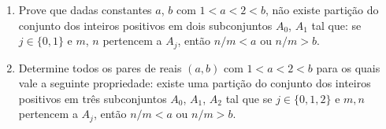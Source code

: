 \begin{enumerate}[label = (\alph*)]
	\item Prove que dadas constantes $a$, $b$ com $1 < a < 2 < b$, não existe partição do conjunto dos inteiros positivos em dois subconjuntos $A_0$, $A_1$ tal que: se $j \in \{0, 1\}$ e $m$, $n$ pertencem a $A_j$, então $n/m < a$ ou $n/m > b$.
	\item Determine todos os pares de reais $(a, b)$ com $1 < a < 2 < b$ para os quais vale a seguinte propriedade: existe uma partição do conjunto dos inteiros positivos em três subconjuntos $A_0$, $A_1$, $A_2$ tal que se $j \in \{0, 1, 2\}$ e $m, n$ pertencem a $A_j$, então $n/m < a$ ou $n/m > b$.
\end{enumerate}
